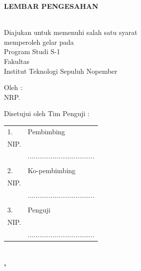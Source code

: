 \begin{center}
  \large
  \textbf{LEMBAR PENGESAHAN}
\end{center}

\begin{center}
  \textbf{\tatitle{}}
\end{center}

\begingroup
\small

\begin{center}
  \textbf{\doctypename{}}
  \\Diajukan untuk memenuhi salah satu syarat \\
  memperoleh gelar \degree{} pada \\
  Program Studi S-1 \studyprogram{} \\
  Fakultas \faculty{} \\
  Institut Teknologi Sepuluh Nopember
\end{center}

\begin{center}
  Oleh : \textbf{\name{}}
  \\NRP. \nrp{}
\end{center}

\begin{center}
  Disetujui oleh Tim Penguji \doctypename{} :
\end{center}

\begingroup
\setlength{\tabcolsep}{0pt}

\noindent
\begin{tabularx}{\textwidth}{X l}
  1. \advisor{}               & Pembimbing                          \\
  \hspace*{1.5em}NIP. \advisornip{}       &                                     \\
                              & ................................... \\
                              &                                     \\
  2. \coadvisor{}             & Ko-pembimbing                       \\
  \hspace*{1.5em}NIP. \coadvisornip{}     &                                     \\
                              & ................................... \\
                              &                                     \\
  3. \examinerone{}           & Penguji                             \\
  \hspace*{1.5em}NIP. \examineronenip{}   &                                     \\
                              & ................................... \\
\end{tabularx}
\endgroup

\vfill

\begin{center}
  \textbf{\MakeUppercase{\place{}}\\\MONTH{}, \the\year{}}
\end{center}
\endgroup

